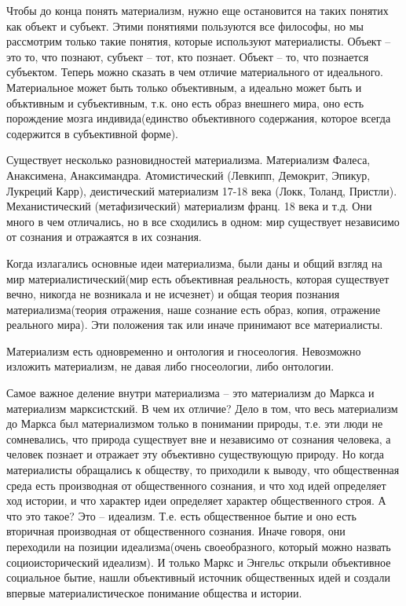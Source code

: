 Чтобы до конца понять материализм, нужно еще остановится на таких понятих как объект и субъект. Этими понятиями пользуются все философы, но мы рассмотрим только такие понятия, которые используют материалисты. Объект – это то, что познают, субъект – тот, кто познает. Объект – то, что познается субъектом. Теперь можно сказать в чем отличие материального от идеального. Материальное может быть только объективным, а идеально может быть и объктивным и субъективным, т.к. оно есть образ внешнего мира, оно есть порождение мозга индивида(единство объективного содержания, которое всегда содержится в субъективной форме).

    Существует несколько разновидностей материализма. Материализм Фалеса, Анаксимена, Анаксимандра. Атомистический (Левкипп, Демокрит, Эпикур, Лукреций Карр), деистический материализм 17-18 века (Локк, Толанд, Пристли). Механистический (метафизический) материализм франц. 18 века и т.д. Они много в чем отличались, но в все сходились в одном: мир существует независимо от сознания и отражаятся в их сознания.

Когда излагались основные идеи материализма, были даны и общий взгляд на мир материалистический(мир есть объективная реальность, которая существует вечно, никогда не возникала и не исчезнет) и общая теория познания материализма(теория отражения, наше сознание есть образ, копия, отражение реального мира). Эти положения так или иначе принимают все материалисты.

Материализм есть одновременно и онтология и гносеология. Невозможно изложить материализм, не давая либо гносеологии, либо онтологии.

Самое важное деление внутри материализма – это материализм до Маркса и материализм марксистский. В чем их отличие? Дело в том, что весь материализм до Маркса был материализмом только в понимании природы, т.е. эти люди не сомневались, что природа существует вне и независимо от сознания человека, а человек познает и отражает эту объективно существующую природу. Но когда материалисты обращались к обществу, то приходили к выводу, что общественная среда есть производная от общественного сознания, и что ход идей определяет ход истории, и что характер идеи определяет характер общественного строя. А что это такое? Это – идеализм. Т.е. есть общественное бытие и оно есть вторичная производная от общественного сознания. Иначе говоря, они переходили на позиции идеализма(очень своеобразного, который можно назвать социоисторический идеализм). И только Маркс и Энгельс открыли объективное социальное бытие, нашли объективный источник общественных идей и создали впервые материалистическое понимание общества и истории.


